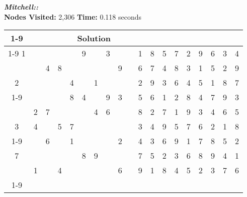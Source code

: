 \documentclass{article}
\begin{document}
\small\emph{\textbf{Mitchell::}}\\ \textbf{Nodes Visited:} 2,306 \textbf{Time:} 0.118 seconds\\
\begin{tabular}{||c|c|c||c|c|c||c|c|c|| c ||c|c|c||c|c|c||c|c|c||}
  \cmidrule{1-9} \cmidrule{11-19}
  \multicolumn{9}{|c|}{Problem} &                   & \multicolumn{9}{|c|}{Solution}   \\\cmidrule{1-9} \cmidrule{11-19} \morecmidrules \cmidrule{1-9} \cmidrule{11-19}
1 &   &   &   &   & 9 &   & 3 &   &  & 1 & 8 & 5 & 7 & 2 & 9 & 6 & 3 & 4\\\morecmidrules \cmidrule{1-9} \cmidrule{11-19}
  &   & 4 & 8 &   &   &   &   & 9 &  & 6 & 7 & 4 & 8 & 3 & 1 & 5 & 2 & 9\\\morecmidrules \cmidrule{1-9} \cmidrule{11-19}
2 &   &   &   & 4 &   & 1 &   &   &  & 2 & 9 & 3 & 6 & 4 & 5 & 1 & 8 & 7\\\cmidrule{1-9} \cmidrule{11-19} \morecmidrules \cmidrule{1-9} \cmidrule{11-19}
  &   &   &   & 8 & 4 &   & 9 & 3 &  & 5 & 6 & 1 & 2 & 8 & 4 & 7 & 9 & 3\\\morecmidrules \cmidrule{1-9} \cmidrule{11-19}
  & 2 & 7 &   &   &   & 4 & 6 &   &  & 8 & 2 & 7 & 1 & 9 & 3 & 4 & 6 & 5\\\morecmidrules \cmidrule{1-9} \cmidrule{11-19}
3 & 4 &   & 5 & 7 &   &   &   &   &  & 3 & 4 & 9 & 5 & 7 & 6 & 2 & 1 & 8\\\cmidrule{1-9} \cmidrule{11-19} \morecmidrules \cmidrule{1-9} \cmidrule{11-19}
  &   & 6 &   & 1 &   &   &   & 2 &  & 4 & 3 & 6 & 9 & 1 & 7 & 8 & 5 & 2\\\morecmidrules \cmidrule{1-9} \cmidrule{11-19}
7 &   &   &   &   & 8 & 9 &   &   &  & 7 & 5 & 2 & 3 & 6 & 8 & 9 & 4 & 1\\\morecmidrules \cmidrule{1-9} \cmidrule{11-19}
  & 1 &   & 4 &   &   &   &   & 6 &  & 9 & 1 & 8 & 4 & 5 & 2 & 3 & 7 & 6\\\cmidrule{1-9} \cmidrule{11-19} \morecmidrules \cmidrule{1-9} \cmidrule{11-19}

 \end{tabular}
\newpage
\end{document}
